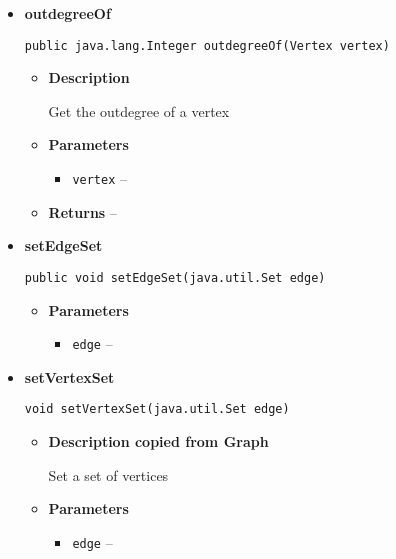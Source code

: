 {{{{{{{{{{{{{{\begin{itemize}
{\begin{itemize}
{}%
\end{itemize}
}%
\item{ 
{\bf  outdegreeOf}\\
\begin{lstlisting}[frame=none]
public java.lang.Integer outdegreeOf(Vertex vertex)\end{lstlisting} %
\begin{itemize}
\item{
{\bf  Description}

Get the outdegree of a vertex
}
\item{
{\bf  Parameters}
  \begin{itemize}
   \item{
\texttt{vertex} -- }
  \end{itemize}
}%
\item{{\bf  Returns} -- 
 
}%
\end{itemize}
}%
\item{ 
{\bf  setEdgeSet}\\
\begin{lstlisting}[frame=none]
public void setEdgeSet(java.util.Set edge)\end{lstlisting} %
\begin{itemize}
\item{
{\bf  Parameters}
  \begin{itemize}
   \item{
\texttt{edge} -- }
  \end{itemize}
}%
\end{itemize}
}%
\item{ 
{\bf  setVertexSet}\\
\begin{lstlisting}[frame=none]
void setVertexSet(java.util.Set edge)\end{lstlisting} %
\begin{itemize}
\item{
{\bf  Description copied from Graph{\small {}} }

Set a set of vertices
}
\item{
{\bf  Parameters}
  \begin{itemize}
   \item{
\texttt{edge} -- }
  \end{itemize}
}%
\end{itemize}
}%
\end{itemize}
}
}
}}}}}}}}}}}}
